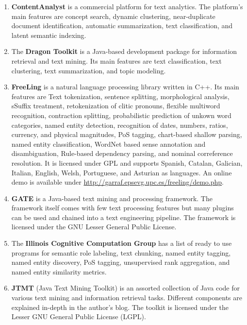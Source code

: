 \begin{enumerate}
	\item \textbf{ContentAnalyst} \cite{contentanalyst} is a commercial platform for text analytics. The platform's main features are concept search, dynamic clustering, near-duplicate document identification, automatic summarization, text classification, and latent semantic indexing.

	\item The \textbf{Dragon Toolkit} \cite{zhou2007dragon} is a Java-based development package for information retrieval and text mining. Its main features are text classification, text clustering, text summarization, and topic modeling.

	\item \textbf{FreeLing} \cite{atserias2006freeling} is a natural language processing library written in C++. Its main features are Text tokenization, sentence splitting, morphological analysis, sSuffix treatment, retokenization of clitic pronouns, flexible multiword recognition, contraction splitting, probabilistic prediction of unkown word categories, named entity detection, recognition of dates, numbers, ratios, currency, and physical magnitudes, PoS tagging, chart-based shallow parsing, named entity classification,  WordNet based sense annotation and disambiguation, Rule-based dependency parsing, and nominal correference resolution.
It is licensed under GPL and supports Spanish, Catalan, Galician, Italian, English, Welsh, Portuguese, and Asturian as languages. An online demo is available under \url{http://garraf.epsevg.upc.es/freeling/demo.php}.

	\item \textbf{GATE} \cite{cunningham2002gate} is a Java-based text mining and processing framework. The framework itself comes with few text processing features but many plugins can be used and chained into a text engineering pipeline.
The framework is licensed under the GNU Lesser General Public License.

	\item The \textbf{Illinois Cognitive Computation Group} \cite{illinoisccg} has a list of ready to use programs for semantic role labeling, text chunking, named entity tagging, named entity discovery, PoS tagging, unsupervised rank aggregation, and named entity similarity metrics.
	
	\item \textbf{JTMT} (Java Text Mining Toolkit) \cite{JTMT} is an assorted collection of Java code for various text mining and information retrieval tasks. Different components are explained in-depth in the author's blog. The toolkit is licensed under the Lesser GNU General Public License (LGPL).
	

\end{enumerate}
